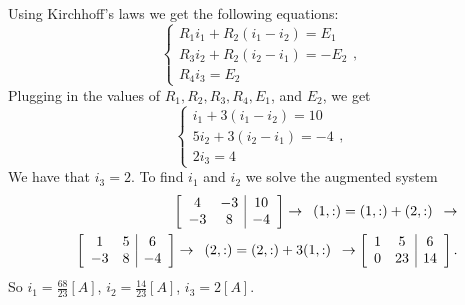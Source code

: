 \vspace{2mm}
Using Kirchhoff's laws we get the following equations:
$$
\left\{\begin{array}{c}R_1i_1+R_2(i_1-i_2)=E_1 \\ R_3i_2+R_2(i_2-i_1)=-E_2\\R_4i_3=E_2 \end{array}\right.,
$$
Plugging in the values of $R_1,R_2,R_3,R_4,E_1$, and $E_2$, we get
$$
\left\{\begin{array}{c}i_1+3(i_1-i_2)=10 \\ 5i_2+3(i_2-i_1)=-4\\2i_3=4 \end{array}\right.,
$$
We have that $i_3=2$. To find $i_1$ and $i_2$ we solve the augmented system
\begin{eqnarray*}
&&\left[\begin{array}{cc|c} 4&-3&10\\-3&8&-4 \end{array}\right]\rightarrow
\begin{array}{c} (1,:)=(1,:)+(2,:) \end{array}\rightarrow\\
&&\left[\begin{array}{cc|c} 1&5&6\\-3&8&-4 \end{array}\right]\rightarrow
\begin{array}{c} (2,:)=(2,:)+3(1,:) \end{array}\rightarrow
\left[\begin{array}{cc|c} 1&5&6\\0&23&14 \end{array}\right].
\end{eqnarray*}
So $i_1=\frac{68}{23}[A]$, $i_2=\frac{14}{23}[A]$, $i_3=2[A]$.

